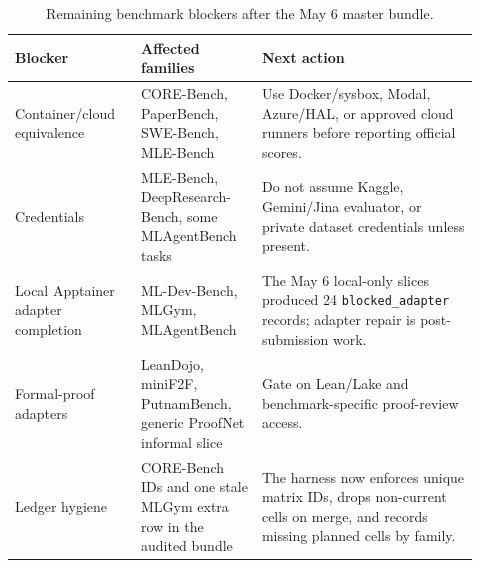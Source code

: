 \documentclass{article}
\begin{document}
\begin{table}[h]
\centering
\caption{Remaining benchmark blockers after the May 6 master bundle.}
\label{tab:benchmark_blockers}
\small
\begin{tabular}{@{}p{0.25\linewidth}p{0.24\linewidth}p{0.43\linewidth}@{}}
\toprule
\textbf{Blocker} & \textbf{Affected families} & \textbf{Next action} \\
\midrule
Container/cloud equivalence & CORE-Bench, PaperBench, SWE-Bench, MLE-Bench & Use Docker/sysbox, Modal, Azure/HAL, or approved cloud runners before reporting official scores. \\
Credentials & MLE-Bench, DeepResearch-Bench, some MLAgentBench tasks & Do not assume Kaggle, Gemini/Jina evaluator, or private dataset credentials unless present. \\
Local Apptainer adapter completion & ML-Dev-Bench, MLGym, MLAgentBench & The May 6 local-only slices produced 24 \texttt{blocked\_adapter} records; adapter repair is post-submission work. \\
Formal-proof adapters & LeanDojo, miniF2F, PutnamBench, generic ProofNet informal slice & Gate on Lean/Lake and benchmark-specific proof-review access. \\
Ledger hygiene & CORE-Bench IDs and one stale MLGym extra row in the audited bundle & The harness now enforces unique matrix IDs, drops non-current cells on merge, and records missing planned cells by family. \\
\bottomrule
\end{tabular}
\end{table}
\end{document}
